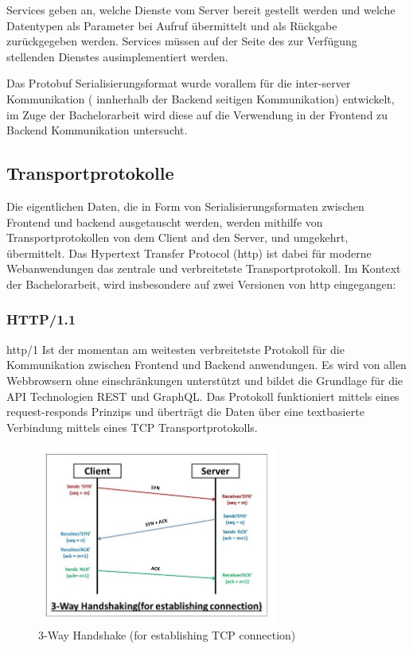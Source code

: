 Services geben an, welche Dienste vom Server bereit gestellt werden und welche Datentypen als Parameter bei Aufruf übermittelt und als Rückgabe zurückgegeben werden. Services müssen auf der Seite des zur Verfügung stellenden Dienstes ausimplementiert werden.

Das Protobuf Serialisierungsformat wurde vorallem für die inter-server Kommunikation ( innherhalb der Backend seitigen Kommunikation) entwickelt, im Zuge der Bachelorarbeit wird diese auf die Verwendung in der Frontend zu Backend Kommunikation untersucht.

\subsection{Transportprotokolle}
Die eigentlichen Daten, die in Form von Serialisierungsformaten zwischen Frontend und backend ausgetauscht werden, werden mithilfe von Transportprotokollen von dem Client and den Server, und umgekehrt, übermittelt. Das Hypertext Transfer Protocol (http) ist dabei für moderne Webanwendungen das zentrale und verbreitetste Transportprotokoll. Im Kontext der Bachelorarbeit, wird insbesondere auf zwei Versionen von http eingegangen:

\subsubsection{HTTP/1.1}

http/1 Ist der momentan am weitesten verbreitetste Protokoll für die Kommunikation zwischen Frontend und Backend anwendungen. Es wird von allen Webbrowsern ohne einschränkungen unterstützt und bildet die Grundlage für die API Technologien REST und GraphQL. Das Protokoll funktioniert mittels eines request-responds Prinzips und überträgt die Daten über eine textbasierte Verbindung mittels eines TCP Transportprotokolls. 

\begin{figure}[htbp]
	\centering
	\includegraphics[width=0.7\textwidth]{images/http1_theory.jpg}
	\caption{3-Way Handshake (for establishing TCP connection)}
	\label{fig:threewayhandshake}
\end{figure}

